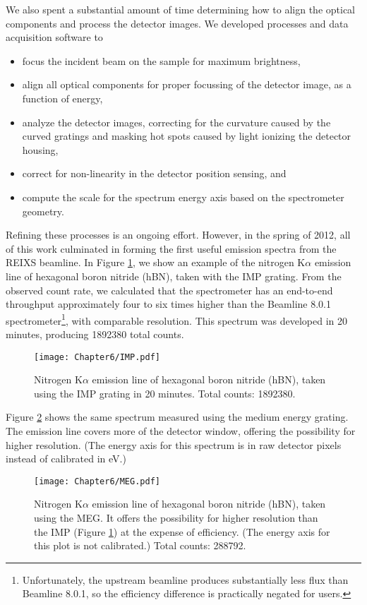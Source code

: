 We also spent a substantial amount of time determining how to align the optical components and process the detector images.  We developed processes and data acquisition software to
\begin{itemize}
\item focus the incident beam on the sample for maximum brightness,
\item align all optical components for proper focussing of the detector image, as a function of energy,
\item analyze the detector images, correcting for the curvature caused by the curved gratings and masking hot spots caused by light ionizing the detector housing,
\item correct for non-linearity in the detector position sensing, and
\item compute the scale for the spectrum energy axis based on the spectrometer geometry.
\end{itemize}

Refining these processes is an ongoing effort.  However, in the spring of 2012, all of this work culminated in forming the first useful emission spectra from the REIXS beamline.  In Figure \ref{impXES}, we show an example of the nitrogen K$\alpha$ emission line of hexagonal boron nitride (hBN), taken with the IMP grating.  From the observed count rate, we calculated that the spectrometer has an end-to-end throughput approximately four to six times higher than the Beamline 8.0.1 spectrometer\footnote{Unfortunately, the upstream beamline produces substantially less flux than Beamline 8.0.1, so the efficiency difference is practically negated for users.}, with comparable resolution.  This spectrum was developed in 20 minutes, producing 1892380 total counts.

\begin{figure}[htbp] %
   \centering
   \texttt{[image: Chapter6/IMP.pdf]} 
   \caption{Nitrogen K$\alpha$ emission line of hexagonal boron nitride (hBN), taken using the IMP grating in 20 minutes.  Total counts: 1892380.}
   \label{impXES}
\end{figure}

Figure \ref{megXES} shows the same spectrum measured using the medium energy grating.  The emission line covers more of the detector window, offering the possibility for higher resolution.  (The energy axis for this spectrum is in raw detector pixels instead of calibrated in eV.)

\begin{figure}[htbp] %
   \centering
   \texttt{[image: Chapter6/MEG.pdf]} 
   \caption{Nitrogen K$\alpha$ emission line of hexagonal boron nitride (hBN), taken using the MEG.  It offers the possibility for higher resolution than the IMP (Figure \ref{impXES}) at the expense of efficiency.  (The energy axis for this plot is not calibrated.)  Total counts: 288792.}
   \label{megXES}
\end{figure}

